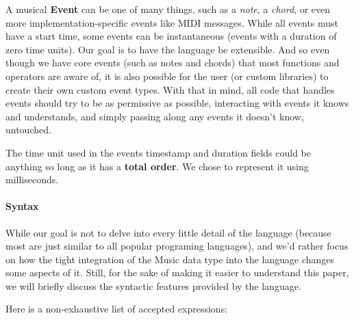 \documentclass[a4paper,UKenglish,cleveref, autoref]{oasics-v2019}
\begin{document}
A musical \textbf{Event} can be one of many things, such as a \textit{note}, a \textit{chord}, or even more implementation-specific events like MIDI messages\cite{Loy1985MusiciansMA}. While all events must have a start time, some events can be instantaneous (events with a duration of zero time units). Our goal is to have the language be extensible. And so even though we have core events (such as notes and chords) that most functions and operators are aware of, it is also possible for the user (or custom libraries) to create their own custom event types. With that in mind, all code that handles events should try to be as permissive as possible, interacting with events it knows and understands, and simply passing along any events it doesn't know, untouched.

The time unit used in the events timestamp and duration fields could be anything so long as it has a \textbf{total order}. We chose to represent it using milliseconds.

\paragraph*{Syntax}
While our goal is not to delve into every little detail of the language (because most are just similar to all popular programing languages), and we'd rather focus on how the tight integration of the Music data type into the language changes some aspects of it. Still, for the sake of making it easier to understand this paper, we will briefly discuss the syntactic features provided by the language.

Here is a non-exhaustive list of accepted expressions:
\end{document}
